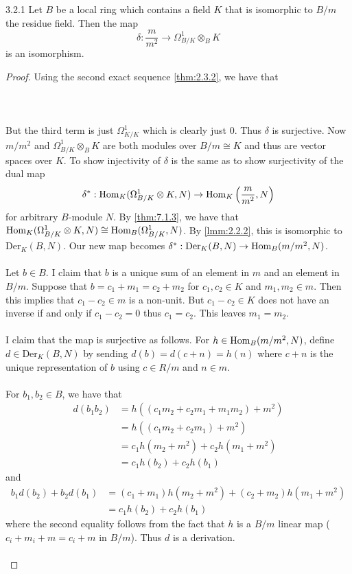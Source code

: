 \documentclass[a4paper]{article}
\begin{document}
\begin{thm}{}{3.2.1} Let $B$ be a local ring which contains a field $K$ that is isomorphic to $B/m$ the residue field. Then the map $$\delta:\frac{m}{m^2}\to\Omega_{B/K}^1\otimes_B K$$ is an isomorphism. \tcbline
\begin{proof}
Using the second exact sequence \ref{thm:2.3.2}, we have that \\~\\
\\~\\
But the third term is just $\Omega_{K/K}^1$ which is clearly just $0$. Thus $\delta$ is surjective. Now $m/m^2$ and $\Omega_{B/K}^1\otimes_B K$ are both modules over $B/m\cong K$ and thus are vector spaces over $K$. To show injectivity of $\delta$ is the same as to show surjectivity of the dual map $$\delta^\ast:\operatorname{Hom}_K(\Omega_{B/K}^1\otimes K,N)\to\operatorname{Hom}_K\left(\frac{m}{m^2},N\right)$$ for arbitrary $B$-module $N$. By \ref{thm:7.1.3}, we have that $\operatorname{Hom}_K(\Omega_{B/K}^1\otimes K,N)\cong\operatorname{Hom}_B(\Omega_{B/K}^1,N)$. By \ref{lmm:2.2.2}, this is isomorphic to $\text{Der}_K(B,N)$. Our new map becomes $\delta^\ast:\text{Der}_K(B,N)\to\operatorname{Hom}_B(m/m^2,N)$. \\~\\

Let $b\in B$. I claim that $b$ is a unique sum of an element in $m$ and an element in $B/m$. Suppose that $b=c_1+m_1=c_2+m_2$ for $c_1,c_2\in K$ and $m_1,m_2\in m$. Then this implies that $c_1-c_2\in m$ is a non-unit. But $c_1-c_2\in K$ does not have an inverse if and only if $c_1-c_2=0$ thus $c_1=c_2$. This leaves $m_1=m_2$. \\~\\

I claim that the map is surjective as follows. For $h\in\operatorname{Hom}_B(m/m^2,N)$, define $d\in\text{Der}_K(B,N)$ by sending $d(b)=d(c+n)=h(n)$ where $c+n$ is the unique representation of $b$ using $c\in R/m$ and $n\in m$. \\~\\

For $b_1,b_2\in B$, we have that 
\begin{align*}
d(b_1b_2)&=h((c_1m_2+c_2m_1+m_1m_2)+m^2)\tag{Write $b_i=c_i+m_i$ where $c_i\in B/m$ and $k_i\in m$}\\
&=h((c_1m_2+c_2m_1)+m^2)\\
&=c_1h(m_2+m^2)+c_2h(m_1+m^2)\\
&=c_1h(b_2)+c_2h(b_1)
\end{align*} and 
\begin{align*}
b_1d(b_2)+b_2d(b_1)&=(c_1+m_1)h(m_2+m^2)+(c_2+m_2)h(m_1+m^2)\\
&=c_1h(b_2)+c_2h(b_1)
\end{align*}
where the second equality follows from the fact that $h$ is a $B/m$ linear map ($c_i+m_i+m=c_i+m$ in $B/m$). Thus $d$ is a derivation. \\~\\


\end{proof}
\end{thm}
\end{document}
